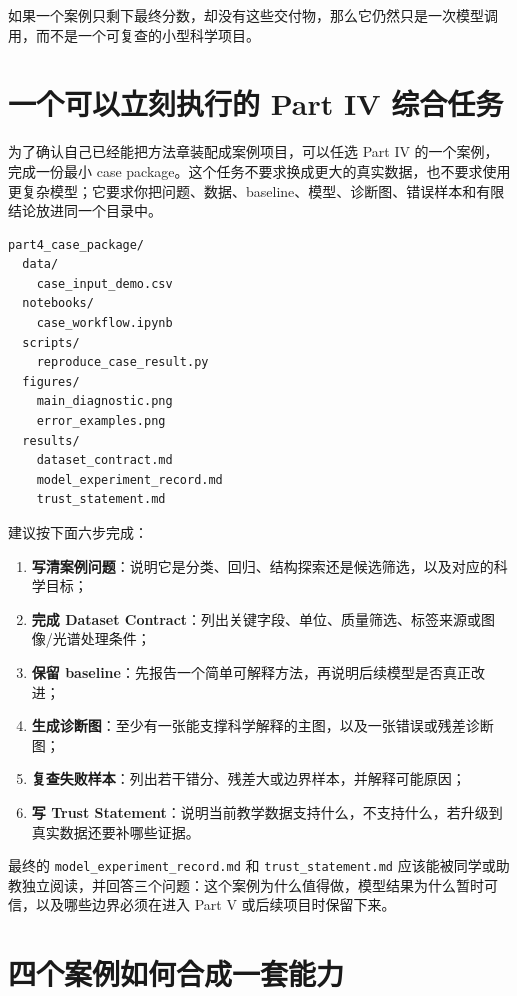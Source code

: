 如果一个案例只剩下最终分数，却没有这些交付物，那么它仍然只是一次模型调用，而不是一个可复查的小型科学项目。

\section*{一个可以立刻执行的 Part IV 综合任务}

为了确认自己已经能把方法章装配成案例项目，可以任选 Part IV 的一个案例，完成一份最小 case package。这个任务不要求换成更大的真实数据，也不要求使用更复杂模型；它要求你把问题、数据、baseline、模型、诊断图、错误样本和有限结论放进同一个目录中。

\begin{examplebox}
\begin{lstlisting}[style=terminal]
part4_case_package/
  data/
    case_input_demo.csv
  notebooks/
    case_workflow.ipynb
  scripts/
    reproduce_case_result.py
  figures/
    main_diagnostic.png
    error_examples.png
  results/
    dataset_contract.md
    model_experiment_record.md
    trust_statement.md
\end{lstlisting}
\end{examplebox}

建议按下面六步完成：

\begin{enumerate}
    \item \textbf{写清案例问题}：说明它是分类、回归、结构探索还是候选筛选，以及对应的科学目标；
    \item \textbf{完成 Dataset Contract}：列出关键字段、单位、质量筛选、标签来源或图像/光谱处理条件；
    \item \textbf{保留 baseline}：先报告一个简单可解释方法，再说明后续模型是否真正改进；
    \item \textbf{生成诊断图}：至少有一张能支撑科学解释的主图，以及一张错误或残差诊断图；
    \item \textbf{复查失败样本}：列出若干错分、残差大或边界样本，并解释可能原因；
    \item \textbf{写 Trust Statement}：说明当前教学数据支持什么，不支持什么，若升级到真实数据还要补哪些证据。
\end{enumerate}

最终的 \texttt{model\_experiment\_record.md} 和 \texttt{trust\_statement.md} 应该能被同学或助教独立阅读，并回答三个问题：这个案例为什么值得做，模型结果为什么暂时可信，以及哪些边界必须在进入 Part V 或后续项目时保留下来。

\section*{四个案例如何合成一套能力}

